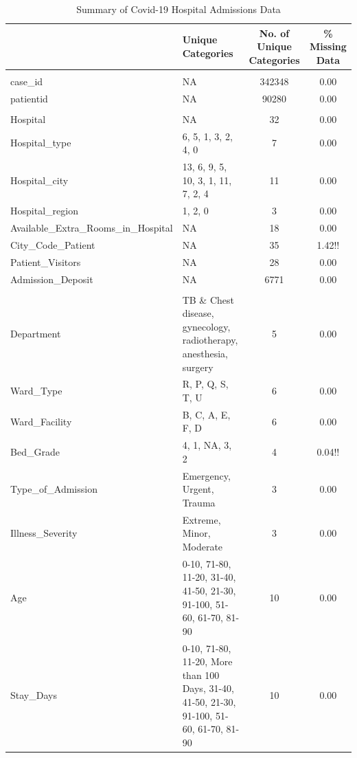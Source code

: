 \documentclass[
]{article}
\begin{document}
\begin{table}[!t]
\caption*{
{\large Summary of Covid-19 Hospital Admissions Data}
} 
\fontsize{12.0pt}{14.4pt}\selectfont
\begin{tabular*}{\linewidth}{@{\extracolsep{\fill}}l|lcc}
\toprule
 & Unique Categories & No. of Unique Categories & \% Missing Data \\ 
\midrule\addlinespace[2.5pt]
\multicolumn{4}{l}{Unique Identifiers} \\[2.5pt] 
\midrule\addlinespace[2.5pt]
case\_id & NA & 342348 & 0.00 \\ 
patientid & NA & 90280 & 0.00 \\ 
\midrule\addlinespace[2.5pt]
\multicolumn{4}{l}{Numerical Features} \\[2.5pt] 
\midrule\addlinespace[2.5pt]
Hospital & NA & 32 & 0.00 \\ 
Hospital\_type & 6, 5, 1, 3, 2, 4, 0 & 7 & 0.00 \\ 
Hospital\_city & 13, 6, 9, 5, 10, 3, 1, 11, 7, 2, 4 & 11 & 0.00 \\ 
Hospital\_region & 1, 2, 0 & 3 & 0.00 \\ 
Available\_Extra\_Rooms\_in\_Hospital & NA & 18 & 0.00 \\ 
City\_Code\_Patient & NA & 35 & 1.42!! \\ 
Patient\_Visitors & NA & 28 & 0.00 \\ 
Admission\_Deposit & NA & 6771 & 0.00 \\ 
\midrule\addlinespace[2.5pt]
\multicolumn{4}{l}{Categorical Features} \\[2.5pt] 
\midrule\addlinespace[2.5pt]
Department & TB \& Chest disease, gynecology, radiotherapy, anesthesia, surgery & 5 & 0.00 \\ 
Ward\_Type & R, P, Q, S, T, U & 6 & 0.00 \\ 
Ward\_Facility & B, C, A, E, F, D & 6 & 0.00 \\ 
Bed\_Grade & 4, 1, NA, 3, 2 & 4 & 0.04!! \\ 
Type\_of\_Admission & Emergency, Urgent, Trauma & 3 & 0.00 \\ 
Illness\_Severity & Extreme, Minor, Moderate & 3 & 0.00 \\ 
Age & 0-10, 71-80, 11-20, 31-40, 41-50, 21-30, 91-100, 51-60, 61-70, 81-90 & 10 & 0.00 \\ 
Stay\_Days & 0-10, 71-80, 11-20, More than 100 Days, 31-40, 41-50, 21-30, 91-100, 51-60, 61-70, 81-90 & 10 & 0.00 \\ 
\bottomrule
\end{tabular*}
\end{table}
\end{document}
